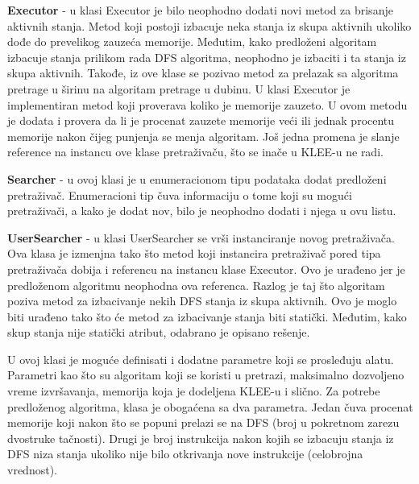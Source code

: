 \documentclass[12pt,oneside]{memoir}
\begin{document}
\begin{description}
    \item \textbf{Executor} - u klasi Executor je bilo neophodno dodati novi metod za brisanje aktivnih stanja. Metod koji postoji izbacuje neka stanja iz skupa aktivnih ukoliko dođe do prevelikog zauzeća memorije. Međutim, kako predloženi algoritam izbacuje stanja prilikom rada DFS algoritma, neophodno je izbaciti i ta stanja iz skupa aktivnih. Takođe, iz ove klase se pozivao metod za prelazak sa algoritma pretrage u širinu na algoritam pretrage u dubinu. U klasi Executor je implementiran metod koji proverava koliko je memorije zauzeto. U ovom metodu je dodata i provera da li je procenat zauzete memorije veći ili jednak procentu memorije nakon čijeg punjenja se menja algoritam. Još jedna promena je slanje reference na instancu ove klase pretraživaču, što se inače u KLEE-u ne radi.
    
    \item \textbf{Searcher} - u ovoj klasi je u enumeracionom tipu podataka dodat predloženi pretraživač. Enumeracioni tip čuva informaciju o tome koji su mogući pretraživači, a kako je dodat nov, bilo je neophodno dodati i njega u ovu listu.
    
    \item \textbf{UserSearcher} - u klasi UserSearcher se vrši instanciranje novog pretraživača. Ova klasa je izmenjna tako što metod koji instancira pretraživač pored tipa pretraživača dobija i referencu na instancu klase Executor. Ovo je urađeno jer je predloženom algoritmu neophodna ova referenca. Razlog je taj što algoritam poziva metod za izbacivanje nekih DFS stanja iz skupa aktivnih. Ovo je moglo biti urađeno tako što će metod za izbacivanje stanja biti statički. Međutim, kako skup stanja nije statički atribut, odabrano je opisano rešenje. 
    
    U ovoj klasi je moguće definisati i dodatne parametre koji se prosleđuju alatu. Parametri kao što su algoritam koji se koristi u pretrazi, maksimalno dozvoljeno vreme izvršavanja, memorija koja je dodeljena KLEE-u i slično. Za potrebe predloženog algoritma, klasa je obogaćena sa dva parametra. Jedan čuva procenat memorije koji nakon što se popuni prelazi se na DFS (broj u pokretnom zarezu dvostruke tačnosti). Drugi je broj instrukcija nakon kojih se izbacuju stanja iz DFS niza stanja ukoliko nije bilo otkrivanja nove instrukcije (celobrojna vrednost).
\end{description}
\end{document}
